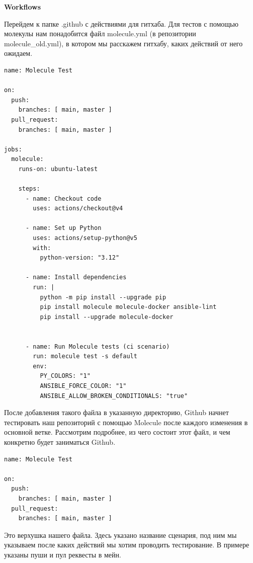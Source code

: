 \documentclass[12pt]{article}
\begin{document}
\newpage
{\Large\bfseries Workflows}\par
Перейдем к папке .github с действиями для гитхаба. Для тестов с помощью молекулы нам понадобится файл molecule.yml (в репозитории molecule\_old.yml), в котором мы расскажем гитхабу, каких действий от него ожидаем.\\
\begin{lstlisting}
name: Molecule Test

on:
  push:
    branches: [ main, master ]
  pull_request:
    branches: [ main, master ]

jobs:
  molecule:
    runs-on: ubuntu-latest

    steps:
      - name: Checkout code
        uses: actions/checkout@v4

      - name: Set up Python
        uses: actions/setup-python@v5
        with:
          python-version: "3.12"
        
      - name: Install dependencies
        run: |
          python -m pip install --upgrade pip
          pip install molecule molecule-docker ansible-lint
          pip install --upgrade molecule-docker
          

      - name: Run Molecule tests (ci scenario)
        run: molecule test -s default
        env:
          PY_COLORS: "1"
          ANSIBLE_FORCE_COLOR: "1"
          ANSIBLE_ALLOW_BROKEN_CONDITIONALS: "true"
\end{lstlisting}
После добавления такого файла в указанную директорию, Github начнет тестировать наш репозиторий с помощью Molecule после каждого изменения в основной ветке. Рассмотрим подробнее, из чего состоит этот файл, и чем конкретно будет заниматься Github.\\
\newpage
\begin{lstlisting}
name: Molecule Test

on:
  push:
    branches: [ main, master ]
  pull_request:
    branches: [ main, master ]
\end{lstlisting}\par
Это верхушка нашего файла. Здесь указано название сценария, под ним мы указываем после каких действий мы хотим проводить тестирование. В примере указаны пуши и пул реквесты в мейн.\par\vspace{10pt}
\end{document}
